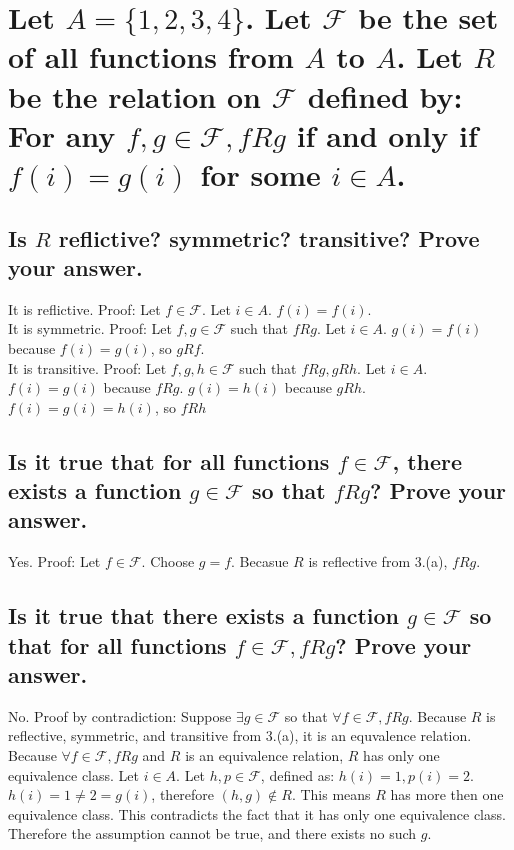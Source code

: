 \documentclass[10pt, letterpaper, titlepage]{article}
\newcommand{\0}{\varnothing}
\newcommand{\F}{\mathcal{F}}
\newcommand{\1}{\{ 1 \}}
\newcommand{\2}{\{ (1,1) \}}
\begin{document}
    \newpage
    \section{Let $A = \{ 1,2,3,4 \}$. Let $\F$ be the set of all functions from $A$ to $A$. Let $R$ be the relation on $\F$ defined by: For any $f,g \in \F, fRg$ if and only if $f(i) = g(i)$ for some $i \in A$.}
        \subsection{Is $R$ reflictive? symmetric? transitive? Prove your answer.}
            It is reflictive. Proof:
            Let $f \in \F$.
            Let $i\in A$.
            $f(i) = f(i)$.
            \\
            It is symmetric. Proof:
            Let $f,g \in \F$ such that $fRg$.
            Let $i\in A$.
            $g(i) = f(i)$ because $f(i) =g(i)$, so $gRf$.
            \\
            It is transitive. Proof:
            Let $f,g,h\in\F$ such that $fRg, gRh$.
            Let $i\in A$.
            $f(i) = g(i)$ because $fRg$.
            $g(i) = h(i)$ because $gRh$.
            $f(i) = g(i) = h(i)$, so $fRh$

        \subsection{Is it true that for all functions $f \in \F$, there exists a function $g \in \F$ so that $fRg$? Prove your answer.}
            Yes. Proof:
            Let $f\in\F$.
            Choose $g = f$.
            Becasue $R$ is reflective from 3.(a), $fRg$.

        \subsection{Is it true that there exists a function $g \in \F$ so that for all functions $f \in \F, fRg$? Prove your answer.}
            No. Proof by contradiction:
            Suppose $\exists g \in\F$ so that $\forall f\in\F, fRg$. 
            Because $R$ is reflective, symmetric, and transitive from 3.(a), it is an equvalence relation.
            Because $\forall f\in\F, fRg$ and $R$ is an equivalence relation, $R$ has only one equivalence class.
            Let $i \in A$.
            Let $h,p \in \F$, defined as: $h(i) = 1, p(i) = 2$.
            $h(i) = 1 \neq 2 = g(i)$, therefore $(h,g) \not\in R$.
            This means $R$ has more then one equivalence class. 
            This contradicts the fact that it has only one equivalence class.
            Therefore the assumption cannot be true, and there exists no such $g$. 
\end{document}
